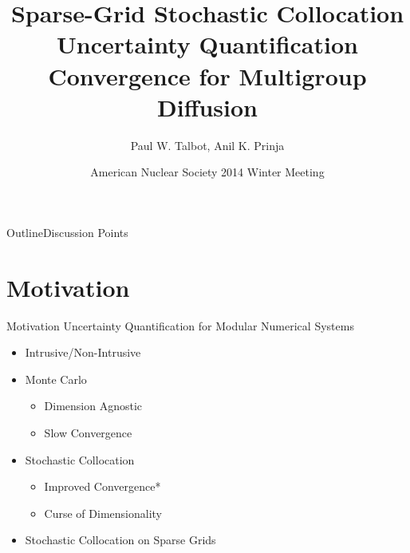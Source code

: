 \documentclass{beamer}
\title[SC UQ for Multigroup Neutron Diffusion] %
{Sparse-Grid Stochastic Collocation Uncertainty Quantification Convergence for Multigroup Diffusion}
\author[Talbot] %
{Paul W. Talbot\inst{1}, Anil K. Prinja\inst{1}}
\institute[University of New Mexico] %
{
  \inst{1}%
  University of New Mexico\\
   \vspace{10pt}
\footnotesize{Supported by Idaho National Laboratory}
}
\date[ANS Winter, 2014] %
{American Nuclear Society 2014 Winter Meeting}
\begin{document}
\begin{frame}
  \titlepage
\end{frame}

\begin{frame}{Outline}{Discussion Points}
  \tableofcontents%
\end{frame}

\section{Motivation}
\begin{frame}{Motivation}\vspace{-30pt}
Uncertainty Quantification for Modular Numerical Systems\vspace{5pt}
\begin{itemize}
  \item Intrusive/Non-Intrusive\vspace{5pt}
  \item Monte Carlo
  \begin{itemize}
    \item Dimension Agnostic
    \item Slow Convergence
  \end{itemize}\vspace{5pt}
  \item Stochastic Collocation
  \begin{itemize}
    \item Improved Convergence*
    \item Curse of Dimensionality
  \end{itemize}\vspace{5pt}
  \item Stochastic Collocation on Sparse Grids
\end{itemize}
\end{frame}
\end{document}
